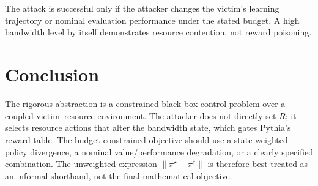 \documentclass[11pt]{article}
\newcommand{\piopt}{\pi^{\star}}
\newcommand{\pitar}{\pi^{\dagger}}
\begin{document}
The attack is successful only if the attacker changes the victim's learning trajectory or nominal evaluation performance under the stated budget. A high bandwidth level by itself demonstrates resource contention, not reward poisoning.

\section{Conclusion}

The rigorous abstraction is a constrained black-box control problem over a coupled victim--resource environment. The attacker does not directly set $\widetilde{R}$; it selects resource actions that alter the bandwidth state, which gates Pythia's reward table. The budget-constrained objective should use a state-weighted policy divergence, a nominal value/performance degradation, or a clearly specified combination. The unweighted expression $\lVert\piopt-\pitar\rVert$ is therefore best treated as an informal shorthand, not the final mathematical objective.
\end{document}

